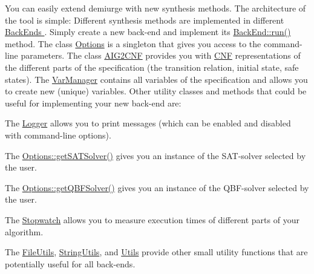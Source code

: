 You can easily extend demiurge with new synthesis methods. The architecture of the tool is simple\-: Different synthesis methods are implemented in different \hyperlink{classBackEnd}{Back\-Ends }. Simply create a new back-\/end and implement its \hyperlink{classBackEnd_a099e717dc71e9cc2d838b1ca86340590}{Back\-End\-::run()} method. The class \hyperlink{classOptions}{Options} is a singleton that gives you access to the command-\/line parameters. The class \hyperlink{classAIG2CNF}{A\-I\-G2\-C\-N\-F} provides you with \hyperlink{classCNF}{C\-N\-F} representations of the different parts of the specification (the transition relation, initial state, safe states). The \hyperlink{classVarManager}{Var\-Manager} contains all variables of the specification and allows you to create new (unique) variables. Other utility classes and methods that could be useful for implementing your new back-\/end are\-: 
\begin{DoxyItemize}
\item The \hyperlink{classLogger}{Logger} allows you to print messages (which can be enabled and disabled with command-\/line options). 
\item The \hyperlink{classOptions_aed3731b7c89433cd485cff35ca4bdcd7}{Options\-::get\-S\-A\-T\-Solver()} gives you an instance of the S\-A\-T-\/solver selected by the user. 
\item The \hyperlink{classOptions_af46f1ca66fde685e029391bda1452a9f}{Options\-::get\-Q\-B\-F\-Solver()} gives you an instance of the Q\-B\-F-\/solver selected by the user. 
\item The \hyperlink{classStopwatch}{Stopwatch} allows you to measure execution times of different parts of your algorithm. 
\item The \hyperlink{classFileUtils}{File\-Utils}, \hyperlink{classStringUtils}{String\-Utils}, and \hyperlink{classUtils}{Utils} provide other small utility functions that are potentially useful for all back-\/ends. 
\end{DoxyItemize}